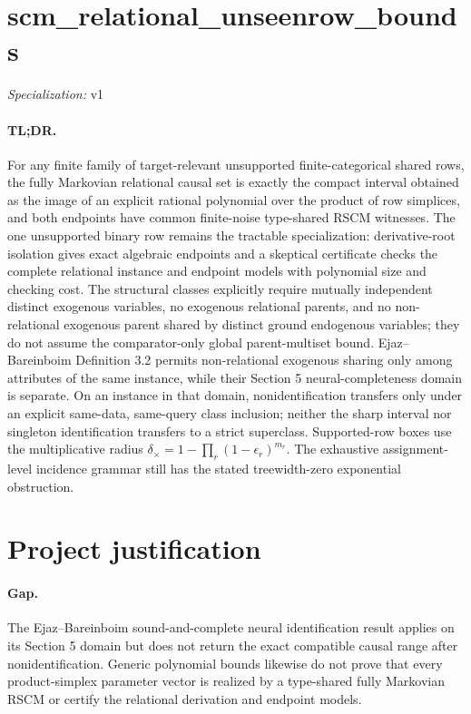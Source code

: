 \documentclass{article}
\begin{document}
\sloppy

\section*{scm\_\allowbreak{}relational\_\allowbreak{}unseenrow\_\allowbreak{}bounds}

\noindent\textit{Specialization:} v1\par

\paragraph{TL;DR.} For any finite family of target-relevant unsupported finite-categorical shared rows, the fully Markovian relational causal set is exactly the compact interval obtained as the image of an explicit rational polynomial over the product of row simplices, and both endpoints have common finite-noise type-shared RSCM witnesses. The one unsupported binary row remains the tractable specialization: derivative-root isolation gives exact algebraic endpoints and a skeptical certificate checks the complete relational instance and endpoint models with polynomial size and checking cost. The structural classes explicitly require mutually independent distinct exogenous variables, no exogenous relational parents, and no non-relational exogenous parent shared by distinct ground endogenous variables; they do not assume the comparator-only global parent-multiset bound. Ejaz--Bareinboim Definition 3.2 permits non-relational exogenous sharing only among attributes of the same instance, while their Section 5 neural-completeness domain is separate. On an instance in that domain, nonidentification transfers only under an explicit same-data, same-query class inclusion; neither the sharp interval nor singleton identification transfers to a strict superclass. Supported-row boxes use the multiplicative radius \(\delta_{\times}=1-\prod_r(1-\epsilon_r)^{m_r}\). The exhaustive assignment-level incidence grammar still has the stated treewidth-zero exponential obstruction.

\section{Project justification}

\paragraph{Gap.} The Ejaz--Bareinboim sound-and-complete neural identification result applies on its Section 5 domain but does not return the exact compatible causal range after nonidentification. Generic polynomial bounds likewise do not prove that every product-simplex parameter vector is realized by a type-shared fully Markovian RSCM or certify the relational derivation and endpoint models.
\end{document}
